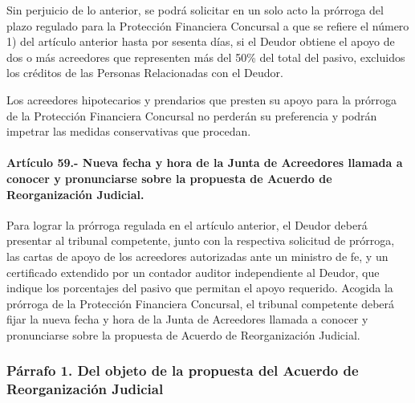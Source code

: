 \documentclass[
]{book}
\begin{document}
Sin perjuicio de lo anterior, se podrá solicitar en un solo acto la prórroga del plazo regulado para la Protección Financiera Concursal a que se refiere el número 1) del artículo anterior hasta por sesenta días, si el Deudor obtiene el apoyo de dos o más acreedores que representen más del 50\% del total del pasivo, excluidos los créditos de las Personas Relacionadas con el Deudor.

Los acreedores hipotecarios y prendarios que presten su apoyo para la prórroga de la Protección Financiera Concursal no perderán su preferencia y podrán impetrar las medidas conservativas que procedan.

\hypertarget{artuxedculo-59.--nueva-fecha-y-hora-de-la-junta-de-acreedores-llamada-a-conocer-y-pronunciarse-sobre-la-propuesta-de-acuerdo-de-reorganizaciuxf3n-judicial.}{%
\paragraph*{Artículo 59.- Nueva fecha y hora de la Junta de Acreedores llamada a conocer y pronunciarse sobre la propuesta de Acuerdo de Reorganización Judicial.}\label{artuxedculo-59.--nueva-fecha-y-hora-de-la-junta-de-acreedores-llamada-a-conocer-y-pronunciarse-sobre-la-propuesta-de-acuerdo-de-reorganizaciuxf3n-judicial.}}

Para lograr la prórroga regulada en el artículo anterior, el Deudor deberá presentar al tribunal competente, junto con la respectiva solicitud de prórroga, las cartas de apoyo de los acreedores autorizadas ante un ministro de fe, y un certificado extendido por un contador auditor independiente al Deudor, que indique los porcentajes del pasivo que permitan el apoyo requerido.
Acogida la prórroga de la Protección Financiera Concursal, el tribunal competente deberá fijar la nueva fecha y hora de la Junta de Acreedores llamada a conocer y pronunciarse sobre la propuesta de Acuerdo de Reorganización Judicial.

\hypertarget{puxe1rrafo-1.-del-objeto-de-la-propuesta-del-acuerdo-de-reorganizaciuxf3n-judicial}{%
\subsubsection*{Párrafo 1. Del objeto de la propuesta del Acuerdo de Reorganización Judicial}\label{puxe1rrafo-1.-del-objeto-de-la-propuesta-del-acuerdo-de-reorganizaciuxf3n-judicial}}
\end{document}
